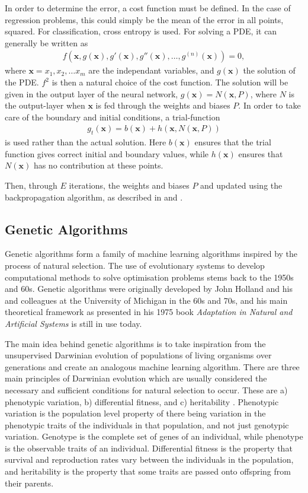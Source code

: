 \documentclass[multicolumn, 12pt]{extarticle}
\begin{document}
In order to determine the error, a cost function must be defined. In the case of regression problems, this could simply be the mean of the error in all points, squared. For classification, cross entropy is used. For solving a PDE, it can generally be written as
\begin{align*}
	f(\mathbf{x}, g(\mathbf{x}), g'(\mathbf{x}), g''(\mathbf{x}), \dots, g^{(n)}(\mathbf{x})) = 0,
\end{align*}
where $\mathbf{x} = x_1, x_2, \dots x_m$ are the independant variables, and $g(\mathbf{x})$ the solution of the PDE. $f^2$ is then a natural choice of the cost function. The solution will be given in the output layer of the neural network, $g(\mathbf{x}) = N(\mathbf{x}, P)$, where $N$ is the output-layer when $\mathbf{x}$ is fed through the weights and biases $P$. In order to take care of the boundary and initial conditions, a trial-function
\begin{align*}
	g_t(\mathbf{x}) = b(\mathbf{x}) + h(\mathbf{x}, N(\mathbf{x}, P))
\end{align*}
is used rather than the actual solution. Here $b(\mathbf{x})$ ensures that the trial function gives correct initial and boundary values, while $h(\mathbf{x})$ ensures that $N(\mathbf{x})$ has no contribution at these points.

Then, through $E$ iterations, the weights and biases $P$ and updated using the backpropagation algorithm, as described in \cite{p2S} and \cite{p2HO}.




\subsection{Genetic Algorithms}
Genetic algorithms form a family of machine learning algorithms inspired by the process of natural selection. The use of evolutionary systems to develop computational methods to solve optimisation problems stems back to the 1950s and 60s. Genetic algorithms were originally developed by John Holland and his and colleagues at the University of Michigan in the 60s and 70s, and his main theoretical framework as presented in his 1975 book \textit{Adaptation in Natural and Artificial Systems} \cite{Holland} is still in use today.

The main idea behind genetic algorithms is to take inspiration from the unsupervised Darwinian evolution of populations of living organisms over generations and create an analogous machine learning algorithm. There are three main principles of Darwinian evolution which are usually considered the necessary and sufficient conditions for natural selection to occur. These are a) phenotypic variation, b) differential fitness, and c) heritability \cite{Mitchell}. Phenotypic variation is the population level property of there being variation in the phenotypic traits of the individuals in that population, and not just genotypic variation. Genotype is the complete set of genes of an individual, while phenotype is the observable traits of an individual. Differential fitness is the property that survival and reproduction rates vary between the individuals in the population, and heritability is the property that some traits are passed onto offspring from their parents.
\end{document}

